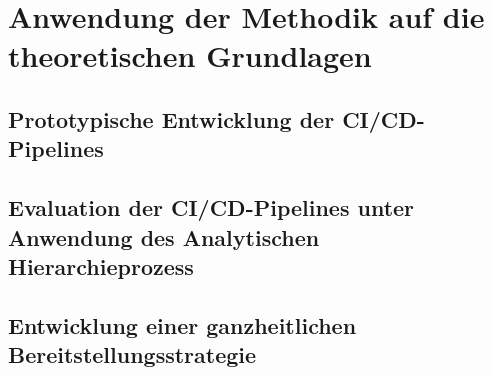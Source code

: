 \section{Anwendung der Methodik auf die theoretischen Grundlagen}

\subsection{Prototypische Entwicklung der CI/CD-Pipelines}

\subsection{Evaluation der CI/CD-Pipelines unter Anwendung des Analytischen Hierarchieprozess}

\subsection{Entwicklung einer ganzheitlichen Bereitstellungsstrategie}
